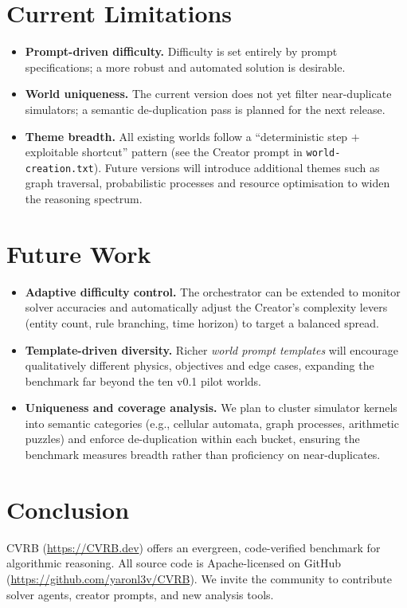 \documentclass[11pt]{article}
\begin{document}
\section{Current Limitations}
\label{sec:limitations}
\begin{itemize}
  \item \textbf{Prompt-driven difficulty.} Difficulty is set entirely by prompt specifications; a more robust and automated solution is desirable.
  \item \textbf{World uniqueness.} The current version does not yet filter near-duplicate simulators; a semantic de-duplication pass is planned for the next release.
  \item \textbf{Theme breadth.} All existing worlds follow a ``deterministic step $+$ exploitable shortcut'' pattern (see the Creator prompt in \verb|world-creation.txt|). Future versions will introduce additional themes such as graph traversal, probabilistic processes and resource optimisation to widen the reasoning spectrum.
\end{itemize}

\section{Future Work}
\label{sec:future}
\begin{itemize}
  \item \textbf{Adaptive difficulty control.} The orchestrator can be extended to monitor solver accuracies and automatically adjust the Creator’s complexity levers (entity count, rule branching, time horizon) to target a balanced spread.
  \item \textbf{Template-driven diversity.} Richer \emph{world prompt templates} will encourage qualitatively different physics, objectives and edge cases, expanding the benchmark far beyond the ten v0.1 pilot worlds.
  \item \textbf{Uniqueness and coverage analysis.} We plan to cluster simulator kernels into semantic categories (e.g., cellular automata, graph processes, arithmetic puzzles) and enforce de-duplication within each bucket, ensuring the benchmark measures breadth rather than proficiency on near-duplicates.
\end{itemize}




\section{Conclusion}
CVRB (\url{https://CVRB.dev}) offers an evergreen, code-verified benchmark for
algorithmic reasoning.  All source code is Apache-licensed on GitHub
(\url{https://github.com/yaronl3v/CVRB}).  We invite the community to contribute
solver agents, creator prompts, and new analysis tools.
\end{document}
